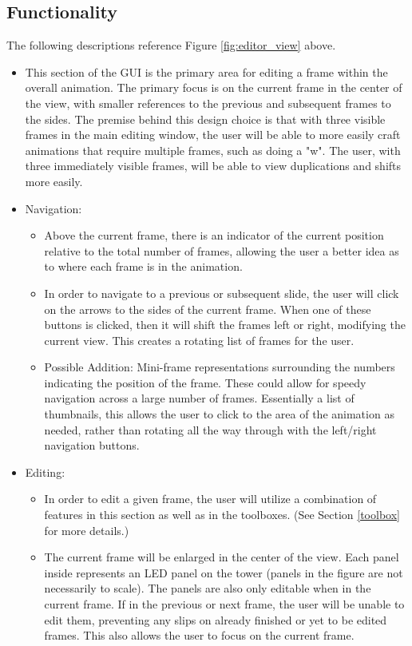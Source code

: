 \documentclass{article}
\begin{document}
	\subsection{Functionality}
	The following descriptions reference Figure \ref{fig:editor_view} above.
	\begin{itemize}
		\item This section of the GUI is the primary area for editing a frame within the overall animation. The primary focus is on the current frame in the center of the view, with smaller references to the previous and subsequent frames to the sides.  The premise behind this design choice is that with three visible frames in the main editing window, the user will be able to more easily craft animations that require multiple frames, such as doing a "w".  The user, with three immediately visible frames, will be able to view duplications and shifts more easily.
		\item Navigation:
		\begin{itemize}
			\item Above the current frame, there is an indicator of the current position relative to the total number of frames, allowing the user a better idea as to where each frame is in the animation.
			\item In order to navigate to a previous or subsequent slide, the user will click on the arrows to the sides of the current frame.  When one of these buttons is clicked, then it will shift the frames left or right, modifying the current view.  This creates a rotating list of frames for the user.
			\item Possible Addition: Mini-frame representations surrounding the numbers indicating the position of the frame. These could allow for speedy navigation across a large number of frames.  Essentially a list of thumbnails, this allows the user to click to the area of the animation as needed, rather than rotating all the way through with the left/right navigation buttons.
		\end{itemize}
		\item Editing:
		\begin{itemize}
			\item In order to edit a given frame, the user will utilize a combination of features in this section as well as in the toolboxes. (See Section \ref{toolbox} for more details.)
			\item The current frame will be enlarged in the center of the view. Each panel inside represents an LED panel on the tower (panels in the figure are not necessarily to scale).  The panels are also only editable when in the current frame.  If in the previous or next frame, the user will be unable to edit them, preventing any slips on already finished or yet to be edited frames.  This also allows the user to focus on the current frame.

\end{itemize}
\end{itemize}
\end{document}
